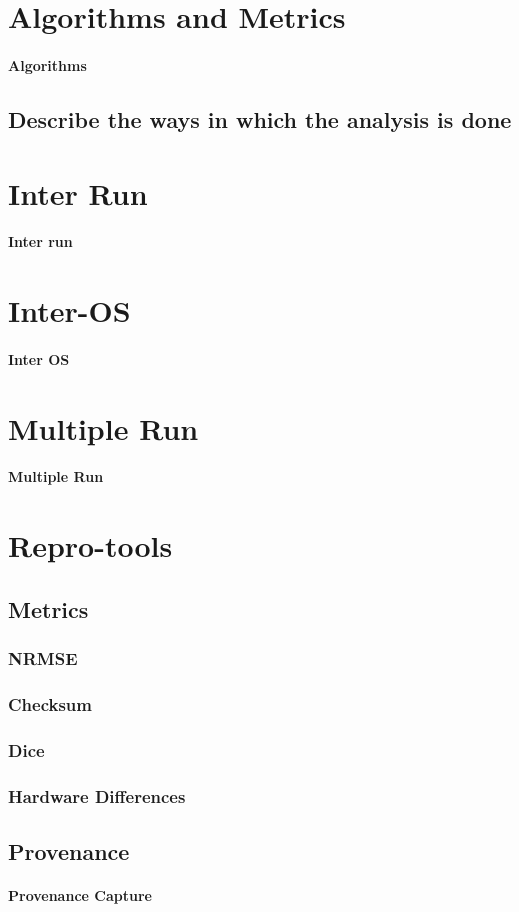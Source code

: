 \section{Algorithms and Metrics}
\paragraph{Algorithms}
\subsection{Describe the ways in which the analysis is done}

\section{Inter Run}
\paragraph{Inter run}

\section{Inter-OS}
\paragraph{Inter OS}

\section{Multiple Run}
\paragraph{Multiple Run}

\section{Repro-tools}
\subsection{Metrics}
\subsubsection{NRMSE}
\subsubsection{Checksum}
\subsubsection{Dice}
\subsubsection{Hardware Differences}
\subsection{Provenance}
\paragraph{Provenance Capture}

